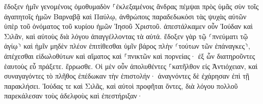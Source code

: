 \documentclass{openreader}
\begin{document}
ἔδοξεν ἡμῖν γενομένοις ὁμοθυμαδὸν ⸀ἐκλεξαμένοις ἄνδρας πέμψαι πρὸς ὑμᾶς σὺν τοῖς ἀγαπητοῖς ἡμῶν Βαρναβᾷ καὶ Παύλῳ, 
ἀνθρώποις παραδεδωκόσι τὰς ψυχὰς αὐτῶν ὑπὲρ τοῦ ὀνόματος τοῦ κυρίου ἡμῶν Ἰησοῦ Χριστοῦ. 
ἀπεστάλκαμεν οὖν Ἰούδαν καὶ Σιλᾶν, καὶ αὐτοὺς διὰ λόγου ἀπαγγέλλοντας τὰ αὐτά. 
ἔδοξεν γὰρ τῷ ⸂πνεύματι τῷ ἁγίῳ⸃ καὶ ἡμῖν μηδὲν πλέον ἐπιτίθεσθαι ὑμῖν βάρος πλὴν ⸂τούτων τῶν ἐπάναγκες⸃, 
ἀπέχεσθαι εἰδωλοθύτων καὶ αἵματος καὶ ⸀πνικτῶν καὶ πορνείας· ἐξ ὧν διατηροῦντες ἑαυτοὺς εὖ πράξετε. ἔρρωσθε. 
Οἱ μὲν οὖν ἀπολυθέντες ⸀κατῆλθον εἰς Ἀντιόχειαν, καὶ συναγαγόντες τὸ πλῆθος ἐπέδωκαν τὴν ἐπιστολήν· 
ἀναγνόντες δὲ ἐχάρησαν ἐπὶ τῇ παρακλήσει. 
Ἰούδας τε καὶ Σιλᾶς, καὶ αὐτοὶ προφῆται ὄντες, διὰ λόγου πολλοῦ παρεκάλεσαν τοὺς ἀδελφοὺς καὶ ἐπεστήριξαν· 
\end{document}
